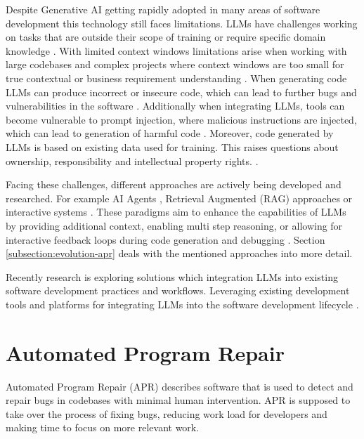 Despite Generative AI getting rapidly adopted in many areas of software development this technology still faces limitations. LLMs have challenges working on tasks that are outside their scope of training or require specific domain knowledge \cite{houLargeLanguageModels2024}. With limited context windows limitations arise when working with large codebases and complex projects where context windows are too small for true contextual or business requirement understanding \cite{bhargavmallampatiRoleGenerativeAI2025}. When generating code LLMs can produce incorrect or insecure code, which can lead to further bugs and vulnerabilities in the software \cite{houLargeLanguageModels2024, bhargavmallampatiRoleGenerativeAI2025}. Additionally when integrating LLMs, tools can become vulnerable to prompt injection, where malicious instructions are injected, which can lead to generation of harmful code \cite{liuPromptInjectionAttack2024}. Moreover, code generated by LLMs is based on existing data used for training. This raises questions about ownership, responsibility and intellectual property rights. \cite{sauvolaFutureSoftwareDevelopment2024, houLargeLanguageModels2024}.

Facing these challenges, different approaches are actively being developed and researched. For example AI Agents \cite{liuMarsCodeAgentAInative2024,yangSWEagentAgentComputerInterfaces2024}, Retrieval Augmented (RAG) approaches \cite{xiaAgentlessDemystifyingLLMbased2024} or interactive systems \cite{xiaAutomatedProgramRepair2024}. These paradigms aim to enhance the capabilities of LLMs by providing additional context, enabling multi step reasoning, or allowing for interactive feedback loops during code generation and debugging \cite{houLargeLanguageModels2024, puvvadiCodingAgentsComprehensive2025}. Section \ref{subsection:evolution-apr} deals with the mentioned approaches into more detail.

Recently research is exploring solutions which integration LLMs into existing software development practices and workflows. Leveraging existing development tools and platforms for integrating LLMs into the software development lifecycle \cite{puvvadiCodingAgentsComprehensive2025, dohmkeGitHubCopilotMeet2025, IntroducingCodex, sauvolaFutureSoftwareDevelopment2024}.

\section{Automated Program Repair}

Automated Program Repair (APR) describes software that is used to detect and repair bugs in codebases with minimal human intervention. \cite{zhangSurveyLearningbasedAutomated2024} APR is supposed to take over the process of fixing bugs, reducing work load for developers and making time to focus on more relevant work. \cite{houLargeLanguageModels2024}

